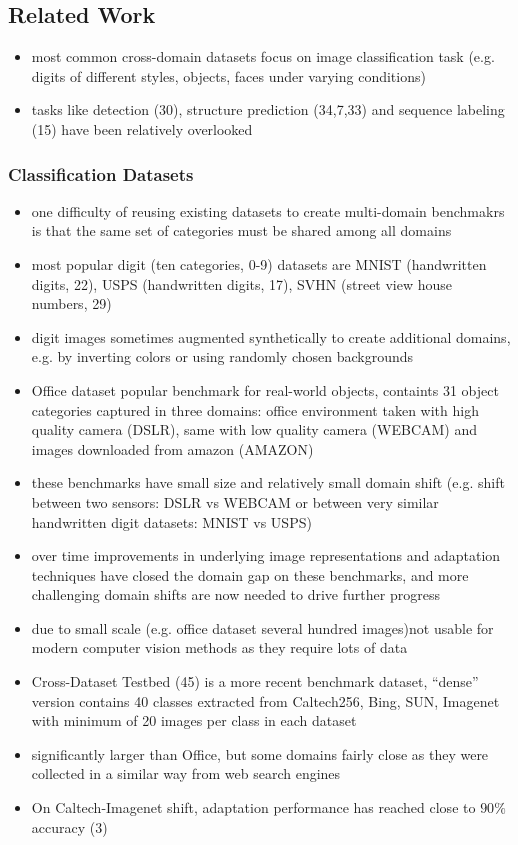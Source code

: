 \documentclass[]{article}
\begin{document}
\subsection{Related Work}
\begin{itemize}
	\item most common cross-domain datasets focus on image classification task (e.g. digits of different styles, objects, faces under varying conditions)
	\item tasks like detection (30), structure prediction (34,7,33) and sequence labeling (15) have been relatively overlooked
\end{itemize}

\subsubsection{Classification Datasets}
\begin{itemize}
	\item one difficulty of reusing existing datasets to create multi-domain benchmakrs is that the same set of categories must be shared among all domains
	\item most popular digit (ten categories, 0-9) datasets are MNIST (handwritten digits, 22), USPS (handwritten digits, 17), SVHN (street view house numbers, 29)
	\item digit images sometimes augmented synthetically to create additional domains, e.g. by inverting colors or using randomly chosen backgrounds
	\item Office dataset popular benchmark for real-world objects, containts 31 object categories captured in three domains: office environment taken with high quality camera (DSLR), same with low quality camera (WEBCAM) and images downloaded from amazon (AMAZON)
	\item these benchmarks have small size and relatively small domain shift (e.g. shift between two sensors: DSLR vs WEBCAM or between very similar handwritten digit datasets: MNIST vs USPS)
	\item over time improvements in underlying image representations and adaptation techniques have closed the domain gap on these benchmarks, and more challenging domain shifts are now needed to drive further progress
	\item due to small scale (e.g. office dataset several hundred images)not usable for modern computer vision methods as they require lots of data
	\item Cross-Dataset Testbed (45) is a more recent benchmark dataset, ``dense'' version contains 40 classes extracted from Caltech256, Bing, SUN, Imagenet with minimum of 20 images per class in each dataset
	\item significantly larger than Office, but some domains fairly close as they were collected in a similar way from web search engines
	\item On Caltech-Imagenet shift, adaptation performance has reached close to $90\%$ accuracy (3)
\end{itemize}
\end{document}
